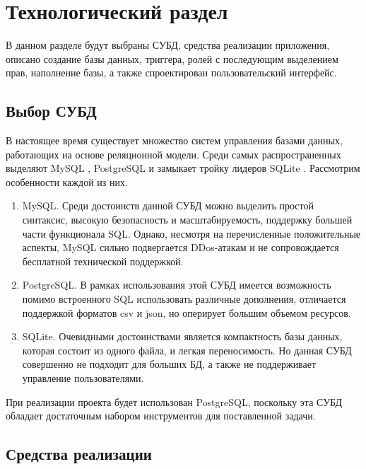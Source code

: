 \chapter{Технологический раздел}

В данном разделе будут выбраны СУБД, средства реализации приложения, описано создание базы данных, триггера, ролей с последующим выделением прав, наполнение базы, а также спроектирован пользовательский интерфейс.

\section{Выбор СУБД}

В настоящее время существует множество систем управления базами данных, работающих на основе реляционной модели. Среди самых распространенных \cite{most_popular} выделяют MySQL \cite{mysql}, PostgreSQL \cite{postgresql} и замыкает тройку лидеров SQLite \cite{sqlite}. Рассмотрим особенности каждой из них.
\begin{enumerate}
	\item MySQL. Среди достоинств данной СУБД можно выделить простой синтаксис, высокую безопасность и масштабируемость, поддержку большей части функционала SQL. Однако, несмотря на перечисленные положительные аспекты, MySQL сильно подвергается DDos-атакам и не сопровождается бесплатной технической поддержкой.
	\item PostgreSQL. В рамках использования этой СУБД имеется возможность помимо встроенного SQL использовать различные дополнения, отличается поддержкой форматов csv и json, но оперирует большим объемом ресурсов.
	\item SQLite. Очевидными достоинствами является компактность базы данных, которая состоит из одного файла, и легкая переносимость. Но данная СУБД совершенно не подходит для больших БД, а также не поддерживает управление пользователями.
\end{enumerate}

При реализации проекта будет использован PostgreSQL, поскольку эта СУБД обладает достаточным набором инструментов для поставленной задачи.


\section{Средства реализации}

